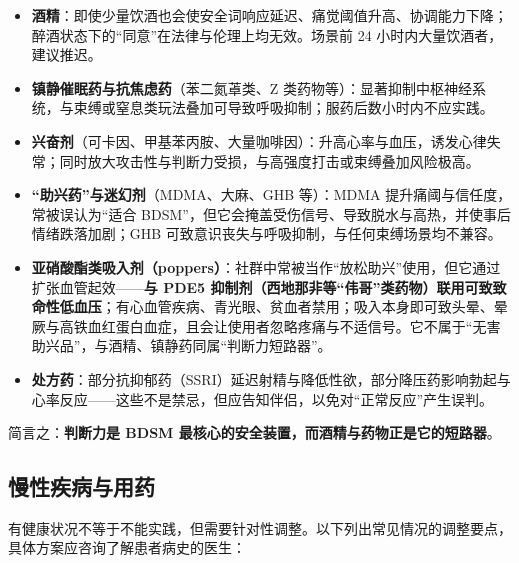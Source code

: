 \documentclass[12pt,UTF8]{ctexbook}
\begin{document}
\begin{itemize}
\item \textbf{酒精}：即使少量饮酒也会使安全词响应延迟、痛觉阈值升高、协调能力下降；醉酒状态下的“同意”在法律与伦理上均无效。场景前 24 小时内大量饮酒者，建议推迟。
\item \textbf{镇静催眠药与抗焦虑药}（苯二氮䓬类、Z 类药物等）：显著抑制中枢神经系统，与束缚或窒息类玩法叠加可导致呼吸抑制；服药后数小时内不应实践。
\item \textbf{兴奋剂}（可卡因、甲基苯丙胺、大量咖啡因）：升高心率与血压，诱发心律失常；同时放大攻击性与判断力受损，与高强度打击或束缚叠加风险极高。
\item \textbf{“助兴药”与迷幻剂}（MDMA、大麻、GHB 等）：MDMA 提升痛阈与信任度，常被误认为“适合 BDSM”，但它会掩盖受伤信号、导致脱水与高热，并使事后情绪跌落加剧；GHB 可致意识丧失与呼吸抑制，与任何束缚场景均不兼容。
\item \textbf{亚硝酸酯类吸入剂（poppers）}：社群中常被当作“放松助兴”使用，但它通过扩张血管起效——\textbf{与 PDE5 抑制剂（西地那非等“伟哥”类药物）联用可致致命性低血压}；有心血管疾病、青光眼、贫血者禁用；吸入本身即可致头晕、晕厥与高铁血红蛋白血症，且会让使用者忽略疼痛与不适信号。它不属于“无害助兴品”，与酒精、镇静药同属“判断力短路器”。
\item \textbf{处方药}：部分抗抑郁药（SSRI）延迟射精与降低性欲，部分降压药影响勃起与心率反应——这些不是禁忌，但应告知伴侣，以免对“正常反应”产生误判。
\end{itemize}

简言之：\textbf{判断力是 BDSM 最核心的安全装置，而酒精与药物正是它的短路器}。

\subsection{慢性疾病与用药}

有健康状况不等于不能实践，但需要针对性调整\citep{dunkley2019clinical}。以下列出常见情况的调整要点，具体方案应咨询了解患者病史的医生：
\end{document}
